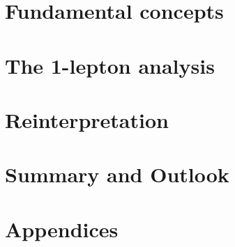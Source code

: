 \documentclass[a4paper,11pt,numbered,customfont]{Classes/PhDThesisPSnPDF}
\begin{document}
\listoftodos[Notes]


\part{Fundamental concepts}\label{part:fundamentals}

\cleardoublepage

\cleardoublepage

\cleardoublepage

\part{The 1-lepton analysis}\label{part:simplified_model_analysis}

\cleardoublepage

\cleardoublepage

\cleardoublepage

\cleardoublepage

\cleardoublepage

\part{Reinterpretation}\label{part:reinterpretation}

\cleardoublepage

\cleardoublepage

\cleardoublepage

\part{Summary and Outlook}\label{part:summary}





\part{Appendices}
\begin{appendices} %
	
	
	
	
	
\end{appendices}
\end{document}
